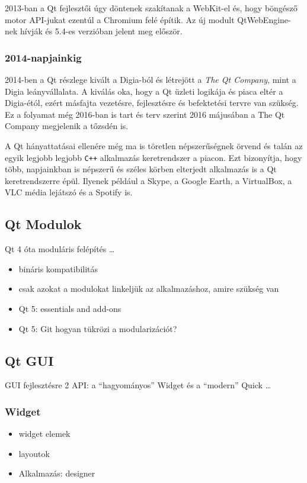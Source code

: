 \documentclass[12pt]{report}
\begin{document}
2013-ban a Qt fejlesztői úgy döntenek szakítanak a WebKit-el és, hogy böngésző motor
API-jukat ezentúl a Chromium felé építik. \cite{bib-qt-blog-introducing-qtwebengine}
Az új modult QtWebEngine-nek hívják és 5.4-es verzióban jelent meg először.
\cite{bib-qt-wiki-qt-history}

\subsubsection{2014-napjainkig}
2014-ben a Qt részlege kivált a Digia-ból és létrejött a \textit{The Qt Company},
mint a Digia leányvállalata. A kiválás oka, hogy a Qt üzleti logikája és piaca eltér a
Digia-étól, ezért másfajta vezetésre, fejlesztésre és befektetési tervre van szükség.
Ez a folyamat még 2016-ban is tart és terv szerint 2016 májusában a The Qt Company megjelenik
a tőzsdén is.
\cite{bib-qt-about-us}

A Qt hányattatásai ellenére még ma is töretlen népszerűségnek örvend és talán az egyik
legjobb legjobb \texttt{C++} alkalmazás keretrendszer a piacon. Ezt bizonyítja,
hogy több, napjainkban is népszerű és széles körben elterjedt alkalmazás is a
Qt keretrendszerre épül. Ilyenek például a Skype, a Google Earth, a VirtualBox,
a VLC média lejátszó és a Spotify is.

\subsection{Qt Modulok}
Qt 4 óta moduláris felépítés \dots
\begin{itemize}
    \item bináris kompatibilitás
    \item csak azokat a modulokat linkeljük az alkalmazáshoz, amire szükség van
    \item Qt 5: essentials and add-ons
    \item Qt 5: Git hogyan tükrözi a modularizációt?
\end{itemize}

\subsection{Qt GUI}
GUI fejlesztésre 2 API: a ``hagyományos'' Widget és a ``modern'' Quick \dots

\subsubsection{Widget}
\begin{itemize}
    \item widget elemek
    \item layoutok
    \item Alkalmazás: designer
\end{itemize}
\end{document}

